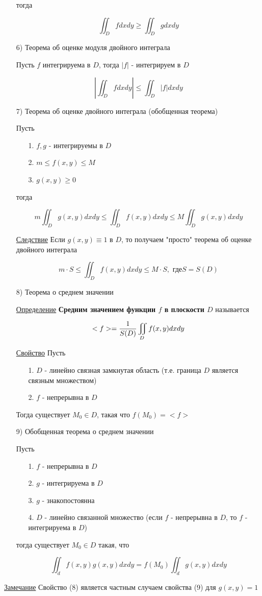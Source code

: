 \documentclass[a4paper, 14pt]{report}
\begin{document}
\begin{enumerate}
		тогда
		
		$$ \iint_D f dxdy \geq \iint_D g dxdy $$
		
		\item[6)] Теорема об оценке модуля двойного интеграла
		
		Пусть $f$ интегрируема в $D$, тогда $|f|$ - интегрируем в $D$
		
		$$ |\iint_D f dxdy| \le \iint_D |f| dxdy $$
		
		\item[7)] Теорема об оценке двойного интеграла (обобщенная теорема)
		
		Пусть 
		
		\begin{enumerate}
			\item[1.] $f,g$ - интегрируемы в $D$
			\item[2.] $m \le f(x,y) \le M$
			\item[3.] $g(x,y) \geq 0$
		\end{enumerate}
		
		тогда
		
		$$ m \iint_D g(x,y) dxdy \le \iint_D f(x,y) dxdy \le M \iint_D g(x,y) dxdy $$
		
		\underline{Следствие} Если $g(x,y) \equiv 1$ в $D$, то получаем "просто" теорема об оценке двойного интеграла
		
		$$ m \cdot S \le \iint_D f(x,y) dxdy \le M \cdot S, \text{ где} S = S(D)$$
		
		
		\item[8)] Теорема о среднем значении
		
		\underline{Определение} \textbf{Средним значением функции $f$ в плоскости $D$} называется
		
		$$ <f> = {1 \over S(D)} \iint_D f(x,y) dxdy $$
		
		\underline{Свойство} Пусть 
		
		\begin{enumerate}
			\item[1.] $D$ - линейно связная замкнутая область (т.е. граница $D$ является связным множеством)
			\item[2.] $f$ - непрерывна в $D$
 		\end{enumerate}
		
		Тогда существует $M_0 \in D$, такая что $f(M_0) = <f>$
		
		\item[9)] Обобщенная теорема о среднем значении
		
		Пусть
		
		\begin{enumerate}
			\item[1.] $f$ - непрерывна в $D$
			\item[2.] $g$ - интегрируема в $D$
			\item[3.] $g$ - знакопостоянна
			\item[4.] $D$ - линейно связанной множество (если $f$ - непрерывна в $D$, то $f$ - интегрируема в $D$)
		\end{enumerate}
		
		тогда существует $M_0 \in D$ такая, что 
		
		$$ \iint_d f(x,y)g(x,y) dxdy = f(M_0) \iint_d g(x,y) dxdy $$
		
	\end{enumerate}
	
	\underline{Замечание} Свойство (8) является частным случаем свойства (9) для $g(x,y) = 1$
	
\end{document}
